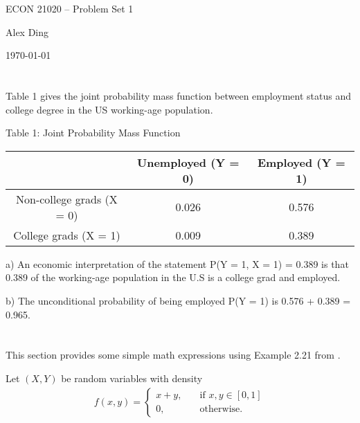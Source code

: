 



{\LARGE \centering ECON 21020 -- Problem Set 1\par}
{\vspace{-1em} \large \centering Alex Ding \par}
{\centering \vspace{-1em} \today \par }

\section{}
Table 1 gives the joint probability mass function between employment status and college degree in the US working-age population.
\begin{center}
Table 1: Joint Probability Mass Function
\end{center}

\begin{table}[h!]
\centering
 \begin{tabular}{||c c c||} 
 \hline
 & Unemployed (Y = 0) & Employed (Y = 1)  \\ [0.5ex] 
 \hline\hline
 Non-college grads (X = 0) & 0.026 & 0.576 \\ 
 College grads (X = 1) & 0.009 & 0.389 \\ [1ex] 
 \hline
 \end{tabular}
\end{table}
 a) An economic interpretation of the statement P(Y = 1, X = 1) = 0.389 is that 0.389 of the working-age population in the U.S is a college grad and employed.
 
 b) The unconditional probability of being employed P(Y = 1) is 0.576 + 0.389 = 0.965. 
\newpage
\section{}

This section provides some simple math expressions using Example 2.21 from \citet{wasserman2003all}.

Let $(X, Y)$ be random variables with density 
\begin{align}\label{pset1:eq_density}
    f(x, y) = \begin{cases} %
        x + y, & \quad \text{if } x, y \in [0, 1] \\
        0, & \quad \text{otherwise.}
    \end{cases}
\end{align}

